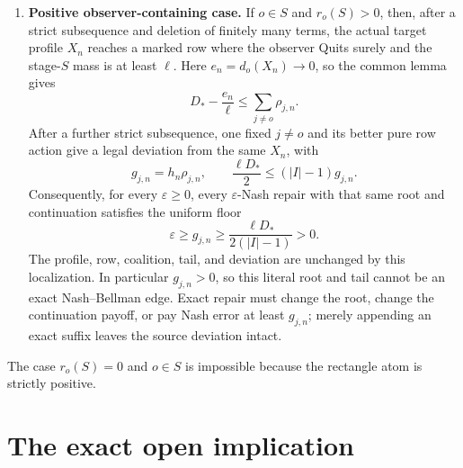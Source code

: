 \documentclass[11pt]{article}
\begin{document}
\begin{enumerate}
      The certificate controls $d_o(X_n)\to0$, not $d_o(Y_n)$.  The profiles
      $X_n$ and $Y_n$ differ by the mover's full reset; the certificate supplies
      neither a smallness bound for this reset nor an observer-debt transport
      inequality across it.  The exact negative observer-containing localization
      therefore retains the term $d_o(Y_n)/\ell$.
      Nevertheless the rowwise dichotomy itself can be frozen: after a
      further strict subsequence, either one fixed outsider $j\ne o$ realizes
      the outsider alternative at every selected row, with the exact gain
      identity and lower bound above, or the observer refusal alternative
      holds at every selected row.  This removes variation of the outsider
      and of the dichotomy, but not the uncontrolled debt term.

\item \textbf{Positive observer-containing case.}  If $o\in S$ and
      $r_o(S)>0$, then, after a strict subsequence and deletion of finitely
      many terms, the actual target profile $X_n$ reaches a marked row where
      the observer Quits surely and the stage-$S$ mass is at least $\ell$.
      Here $e_n=d_o(X_n)\to0$, so the common lemma gives
      \[
       D_*-\frac{e_n}{\ell}
       \le\sum_{j\ne o}\rho_{j,n}.
      \]
      After a further strict subsequence, one fixed $j\ne o$ and its better
      pure row action give a legal deviation from the same $X_n$, with
      \[
       g_{j,n}=h_n\rho_{j,n},
       \qquad
       \frac{\ell D_*}{2}\le(|I|-1)g_{j,n}.
      \]
      Consequently, for every $\varepsilon\ge0$, every
      $\varepsilon$-Nash repair with that same root and continuation
      satisfies the uniform floor
      \[
       \varepsilon\ge g_{j,n}\ge
         \frac{\ell D_*}{2(|I|-1)}>0.
      \]
      The profile, row, coalition, tail, and deviation are unchanged by this
      localization.  In particular $g_{j,n}>0$, so this literal root and tail
      cannot be an exact Nash--Bellman edge.  Exact repair must change the
      root, change the continuation payoff, or pay Nash error at least
      $g_{j,n}$; merely appending an exact suffix leaves the source deviation
      intact.
\end{enumerate}

The case $r_o(S)=0$ and $o\in S$ is impossible because the
rectangle atom is strictly positive.

\section{The exact open implication}
\end{document}
